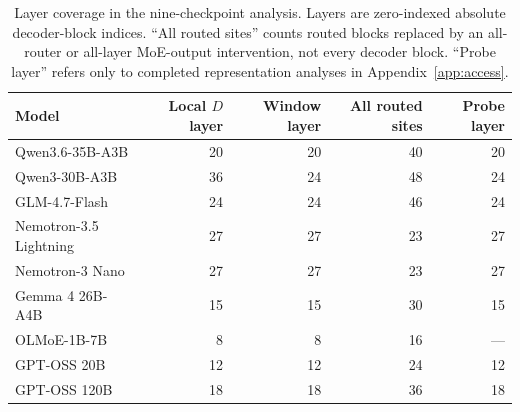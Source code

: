 \begin{table}[htbp]
\centering
\small
\setlength{\tabcolsep}{5pt}
\caption{Layer coverage in the nine-checkpoint analysis. Layers are zero-indexed
absolute decoder-block indices. ``All routed sites'' counts routed blocks
replaced by an all-router or all-layer MoE-output intervention, not every
decoder block. ``Probe layer'' refers only to completed representation analyses
in Appendix~\ref{app:access}.}
\label{tab:abc-anchors}
\begin{tabularx}{\textwidth}{@{}Yrrrr@{}}
\toprule
Model & Local $D$ layer & Window layer & All routed sites & Probe layer \\
\midrule
Qwen3.6-35B-A3B & 20 & 20 & 40 & 20 \\
Qwen3-30B-A3B & 36 & 24 & 48 & 24 \\
GLM-4.7-Flash & 24 & 24 & 46 & 24 \\
Nemotron-3.5 Lightning & 27 & 27 & 23 & 27 \\
Nemotron-3 Nano & 27 & 27 & 23 & 27 \\
Gemma 4 26B-A4B & 15 & 15 & 30 & 15 \\
OLMoE-1B-7B & 8 & 8 & 16 & --- \\
GPT-OSS 20B & 12 & 12 & 24 & 12 \\
GPT-OSS 120B & 18 & 18 & 36 & 18 \\
\bottomrule
\end{tabularx}
\end{table}
